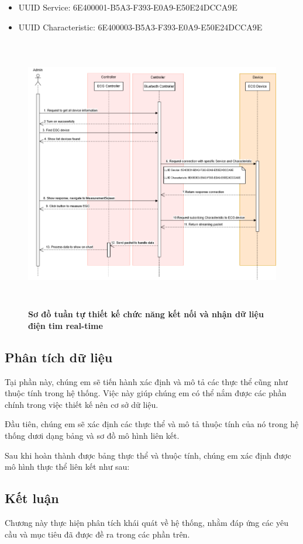 \begin{adjustwidth}{1.5em}{}
  \begin{itemize}
    \item UUID Service: 6E400001-B5A3-F393-E0A9-E50E24DCCA9E
    \item UUID Characteristic: 6E400003-B5A3-F393-E0A9-E50E24DCCA9E
  \end{itemize}
  \end{adjustwidth}

\begin{figure}[H]
    \centering
    \includegraphics[width=12cm,height=12cm]{Images/System/BLE_system.drawio.png}
    \caption[Sơ đồ tuần tự thiết kế chức năng kết nối và nhận dữ liệu điện tim real-time]{\bfseries \fontsize{12pt}{0pt}\selectfont Sơ đồ tuần tự thiết kế chức năng kết nối và nhận dữ liệu điện tim real-time}
    \label{BLE_system} %
  \end{figure}
\subsection{Phân tích dữ liệu}

Tại phần này, chúng em sẽ tiến hành xác định và mô tả các thực thể cũng như
 thuộc tính trong hệ thống. Việc này giúp chúng em có thể nắm được các phần chính 
 trong việc thiết kế nên cơ sở dữ liệu.

Đầu tiên, chúng em sẽ xác định các thực thể và mô tả thuộc tính của nó trong hệ
thống dươi dạng bảng và sơ đồ mô hình liên kết. 


Sau khi hoàn thành được bảng thực thể và thuộc tính, chúng em xác định được mô hình thực thể liên kết như sau:

\subsection{Kết luận}

Chương này thực hiện phân tích khái quát về
 hệ thống, nhằm đáp ứng các yêu cầu và mục tiêu đã được đề ra trong các phần trên.

\newpage
